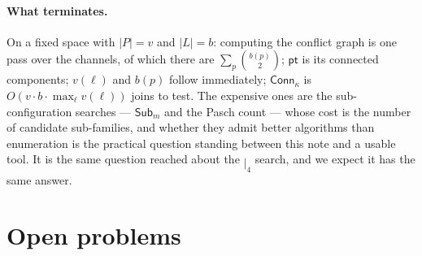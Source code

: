 \documentclass[11pt]{article}
\theoremstyle{plain}
\theoremstyle{definition}
\newcommand{\bmid}{\mathbin{|}}
\newcommand{\pt}{\mathsf{pt}}
\newcommand{\Sub}{\mathsf{Sub}}
\newcommand{\Conn}{\mathsf{Conn}}
\begin{document}
\paragraph{What terminates.} On a fixed space with $|P|=v$ and $|L|=b$: computing the conflict
graph is one pass over the channels, of which there are $\sum_p \binom{b(p)}{2}$; $\pt$ is its
connected components; $v(\ell)$ and $b(p)$ follow immediately; $\Conn_\kappa$ is
$O(v \cdot b \cdot \max_\ell v(\ell))$ joins to test. The expensive ones are the sub-configuration
searches --- $\Sub_m$ and the Pasch count --- whose cost is the number of candidate sub-families,
and whether they admit better algorithms than enumeration is the practical question standing
between this note and a usable tool. It is the same question \cite[\S6]{Classifier} reached about
the $\bmid_4$ search, and we expect it has the same answer.

\section{Open problems}
\label{sec:open}
\end{document}
